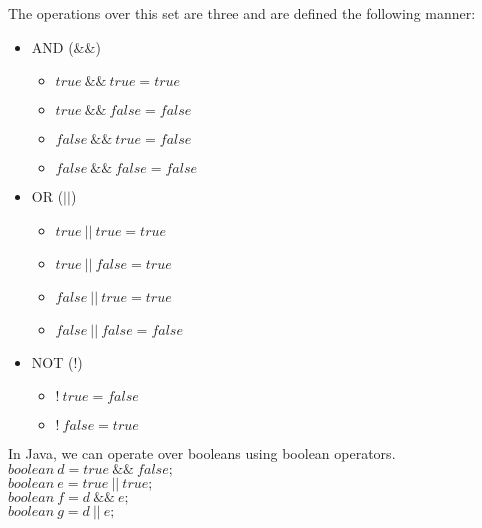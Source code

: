 \documentclass[a4paper]{article}
\begin{document}
	The operations over this set are three and are defined the following manner:
	\begin{itemize}
		\item AND (\&\&)
		\begin{itemize}
			\item $true\ \&\&\ true = true$
			\item $true\ \&\&\ false = false$
			\item $false\ \&\&\ true = false$
			\item $false\ \&\&\ false = false$
		\end{itemize}
		\item OR ($||$)
		\begin{itemize}
			\item $true\ ||\ true = true$
			\item $true\ ||\ false = true$
			\item $false\ ||\ true = true$
			\item $false\ ||\ false = false$
		\end{itemize}
		\item NOT (!)
		\begin{itemize}
			\item $!\ true = false$
			\item $!\ false = true$
		\end{itemize}
	\end{itemize}
	In Java, we can operate over booleans using boolean operators.\\
	$boolean\ d = true\ \&\&\ false;$\\
	$boolean\ e = true\ ||\ true;$\\
	$boolean\ f = d\ \&\&\ e;$\\
	$boolean\ g = d\ ||\ e;$\\
\end{document}
